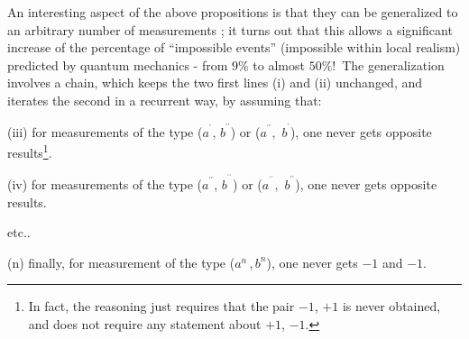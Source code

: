\documentclass[12pt,onecolumn]{article}%
\begin{document}
An interesting aspect of the above propositions is that they can be
generalized to an arbitrary number of measurements \cite{Hardy2}; it turns out
that this allows a significant increase of the percentage of ``impossible
events'' (impossible within local realism) predicted by quantum mechanics -
from $9\%$ to almost $50\%$!\ The generalization involves a chain, which keeps
the two first lines (i) and (ii) unchanged, and iterates the second in a
recurrent way, by assuming that:

(iii) for measurements of the type ($a^{^{\prime}}$, $b^{^{\prime\prime}}$) or
($a^{^{\prime\prime}},$ $b^{^{\prime}}$), one never gets opposite
results\footnote{In fact, the reasoning just requires that the pair $-1$, $+1$
is never obtained, and does not require any statement about $+1$, $-1$.}.

(iv) for measurements of the type ($a^{^{\prime\prime}}$, $b^{^{^{\prime
\prime\prime}}}$) or ($a^{^{^{\prime\prime\prime}}},$ $b^{^{\prime\prime}}$),
one never gets opposite results.

etc..

(n) finally, for measurement of the type ($a^{n}\,$,$\,b^{n}$), one never gets
$-1$ and $-1$.
\end{document}

